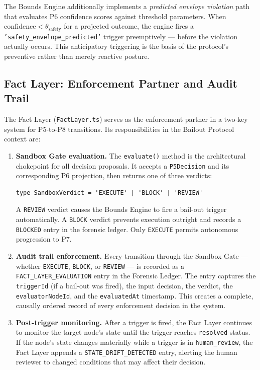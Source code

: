 The Bounds Engine additionally implements a \emph{predicted envelope violation} path
that evaluates P6 confidence scores against threshold parameters.  When
$\text{confidence} < \theta_{\text{safety}}$ for a projected outcome, the engine
fires a \texttt{'safety\_envelope\_predicted'} trigger preemptively — before the
violation actually occurs.  This anticipatory triggering is the basis of the
protocol's preventive rather than merely reactive posture.

\subsection{Fact Layer: Enforcement Partner and Audit Trail}

The Fact Layer (\texttt{FactLayer.ts}) serves as the enforcement partner in a
two-key system for P5-to-P8 transitions.  Its responsibilities in the Bailout
Protocol context are:

\begin{enumerate}
  \item \textbf{Sandbox Gate evaluation.}  The \texttt{evaluate()} method is the
        architectural chokepoint for all decision proposals.  It accepts a
        \texttt{P5Decision} and its corresponding P6 projection, then returns one
        of three verdicts:

\begin{verbatim}
type SandboxVerdict = 'EXECUTE' | 'BLOCK' | 'REVIEW'
\end{verbatim}

        A \texttt{REVIEW} verdict causes the Bounds Engine to fire a bail-out trigger
        automatically.  A \texttt{BLOCK} verdict prevents execution outright and
        records a \texttt{BLOCKED} entry in the forensic ledger.  Only \texttt{EXECUTE}
        permits autonomous progression to P7.

  \item \textbf{Audit trail enforcement.}  Every transition through the Sandbox Gate
        — whether \texttt{EXECUTE}, \texttt{BLOCK}, or \texttt{REVIEW} — is recorded
        as a \texttt{FACT\_LAYER\_EVALUATION} entry in the Forensic Ledger.  The entry
        captures the \texttt{triggerId} (if a bail-out was fired), the input decision,
        the verdict, the \texttt{evaluatorNodeId}, and the \texttt{evaluatedAt}
        timestamp.  This creates a complete, causally ordered record of every
        enforcement decision in the system.

  \item \textbf{Post-trigger monitoring.}  After a trigger is fired, the Fact Layer
        continues to monitor the target node's state until the trigger reaches
        \texttt{resolved} status.  If the node's state changes materially while a
        trigger is in \texttt{human\_review}, the Fact Layer appends a
        \texttt{STATE\_DRIFT\_DETECTED} entry, alerting the human reviewer to
        changed conditions that may affect their decision.
\end{enumerate}

